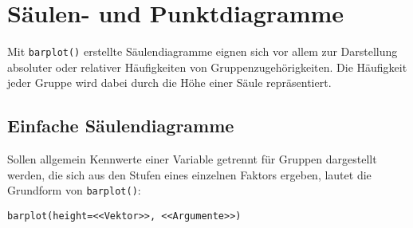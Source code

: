 \section{Säulen- und Punktdiagramme}
\label{sec:barplot}

Mit \lstinline!barplot()! erstellte Säulendiagramme eignen sich vor allem zur Darstellung absoluter oder relativer Häufigkeiten von Gruppenzugehörigkeiten. Die Häufigkeit jeder Gruppe wird dabei durch die Höhe einer Säule repräsentiert.

\subsection{Einfache Säulendiagramme}

Sollen allgemein Kennwerte einer Variable getrennt für Gruppen dargestellt werden, die sich aus den Stufen eines einzelnen Faktors ergeben, lautet die Grundform von \lstinline!barplot()!:
\begin{lstlisting}
barplot(height=<<Vektor>>, <<Argumente>>)
\end{lstlisting}

